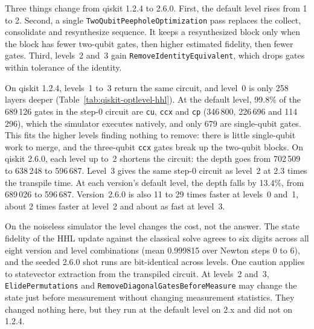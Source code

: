 Three things change from qiskit 1.2.4 to 2.6.0. First, the default level rises
from 1 to 2. Second, a single \texttt{TwoQubitPeepholeOptimization} pass
replaces the collect, consolidate and resynthesize sequence. It keeps a
resynthesized block only when the block has fewer two-qubit gates, then
higher estimated fidelity, then fewer gates. Third, levels~2 and~3 gain
\texttt{RemoveIdentityEquivalent}, which drops gates within tolerance of the
identity.

On qiskit 1.2.4, levels~1 to~3 return the same circuit, and level~0 is only
258 layers deeper (Table~\ref{tab:qiskit-optlevel-hhl}). At the default level,
99.8\% of the 689\,126 gates in the step-0 circuit are \texttt{cu},
\texttt{ccx} and \texttt{cp} (346\,800, 226\,696 and 114\,296), which the
simulator executes natively, and only 679 are single-qubit gates. This fits
the higher levels finding nothing to remove: there is little single-qubit work
to merge, and the three-qubit \texttt{ccx} gates break up the two-qubit
blocks. On qiskit 2.6.0, each level up to~2 shortens the circuit: the depth
goes from 702\,509 to 638\,248 to 596\,687. Level~3 gives the same step-0
circuit as level~2 at 2.3 times the transpile time. At each version's default
level, the depth falls by 13.4\%, from 689\,026 to 596\,687. Version~2.6.0 is
also 11 to 29 times faster at levels~0 and~1, about 2 times faster at level~2
and about as fast at level~3.

On the noiseless simulator the level changes the cost, not the answer. The
state fidelity of the HHL update against the classical solve agrees to six
digits across all eight version and level combinations (mean 0.999815 over
Newton steps 0 to 6), and the seeded 2.6.0 shot runs are bit-identical across
levels. One caution applies to statevector extraction from the transpiled
circuit. At levels~2 and~3, \texttt{ElidePermutations} and
\texttt{RemoveDiagonalGatesBeforeMeasure} may change the state just before
measurement without changing measurement statistics. They changed nothing
here, but they run at the default level on 2.x and did not on 1.2.4.
